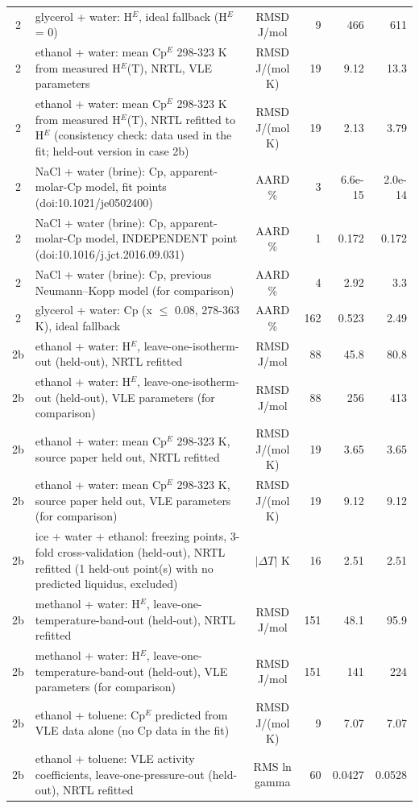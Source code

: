 \begin{tabular}{c p{8.6cm} c r r r}
2 & glycerol + water: H$^E$, ideal fallback (H$^E$ = 0) & RMSD J/mol & 9 & 466 & 611 \\
2 & ethanol + water: mean Cp$^E$ 298-323 K from measured H$^E$(T), NRTL, VLE parameters & RMSD J/(mol K) & 19 & 9.12 & 13.3 \\
2 & ethanol + water: mean Cp$^E$ 298-323 K from measured H$^E$(T), NRTL refitted to H$^E$ (consistency check: data used in the fit; held-out version in case 2b) & RMSD J/(mol K) & 19 & 2.13 & 3.79 \\
2 & NaCl + water (brine): Cp, apparent-molar-Cp model, fit points (doi:10.1021/je0502400) & AARD \% & 3 & 6.6e-15 & 2.0e-14 \\
2 & NaCl + water (brine): Cp, apparent-molar-Cp model, INDEPENDENT point (doi:10.1016/j.jct.2016.09.031) & AARD \% & 1 & 0.172 & 0.172 \\
2 & NaCl + water (brine): Cp, previous Neumann--Kopp model (for comparison) & AARD \% & 4 & 2.92 & 3.3 \\
2 & glycerol + water: Cp (x $\le$ 0.08, 278-363 K), ideal fallback & AARD \% & 162 & 0.523 & 2.49 \\
2b & ethanol + water: H$^E$, leave-one-isotherm-out (held-out), NRTL refitted & RMSD J/mol & 88 & 45.8 & 80.8 \\
2b & ethanol + water: H$^E$, leave-one-isotherm-out (held-out), VLE parameters (for comparison) & RMSD J/mol & 88 & 256 & 413 \\
2b & ethanol + water: mean Cp$^E$ 298-323 K, source paper held out, NRTL refitted & RMSD J/(mol K) & 19 & 3.65 & 3.65 \\
2b & ethanol + water: mean Cp$^E$ 298-323 K, source paper held out, VLE parameters (for comparison) & RMSD J/(mol K) & 19 & 9.12 & 9.12 \\
2b & ice + water + ethanol: freezing points, 3-fold cross-validation (held-out), NRTL refitted (1 held-out point(s) with no predicted liquidus, excluded) & $|\Delta T|$ K & 16 & 2.51 & 2.51 \\
2b & methanol + water: H$^E$, leave-one-temperature-band-out (held-out), NRTL refitted & RMSD J/mol & 151 & 48.1 & 95.9 \\
2b & methanol + water: H$^E$, leave-one-temperature-band-out (held-out), VLE parameters (for comparison) & RMSD J/mol & 151 & 141 & 224 \\
2b & ethanol + toluene: Cp$^E$ predicted from VLE data alone (no Cp data in the fit) & RMSD J/(mol K) & 9 & 7.07 & 7.07 \\
2b & ethanol + toluene: VLE activity coefficients, leave-one-pressure-out (held-out), NRTL refitted & RMS ln gamma & 60 & 0.0427 & 0.0528 \\

\end{tabular}
